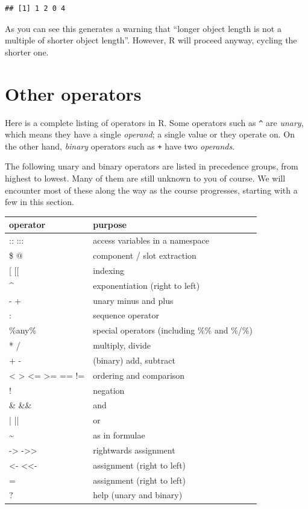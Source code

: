\documentclass[]{book}
\begin{document}
\begin{verbatim}
## [1] 1 2 0 4
\end{verbatim}

As you can see this generates a warning that ``longer object length is not a multiple of shorter object length''. However, R will proceed anyway, cycling the shorter one.

\hypertarget{other-operators}{%
\section{Other operators}\label{other-operators}}

Here is a complete listing of operators in R. Some operators such as \texttt{\^{}} are \emph{unary}, which means they have a single \emph{operand}; a single value or they operate on. On the other hand, \emph{binary} operators such as \texttt{+} have two \emph{operands}.

The following unary and binary operators are listed in precedence groups, from highest to lowest. Many of them are still unknown to you of course. We will encounter most of these along the way as the course progresses, starting with a few in this section.

\begin{tabular}{l|l}
\hline
operator & purpose\\
\hline
:: ::: & access variables in a namespace\\
\hline
\$ @ & component / slot extraction\\
\hline
[ [[ & indexing\\
\hline
\textasciicircum{} & exponentiation (right to left)\\
\hline
- + & unary minus and plus\\
\hline
: & sequence operator\\
\hline
\%any\% & special operators (including \%\% and \%/\%)\\
\hline
* / & multiply, divide\\
\hline
+ - & (binary) add, subtract\\
\hline
< > <= >= == != & ordering and comparison\\
\hline
! & negation\\
\hline
\& \&\& & and\\
\hline
| || & or\\
\hline
\textasciitilde{} & as in formulae\\
\hline
-> ->> & rightwards assignment\\
\hline
<- <<- & assignment (right to left)\\
\hline
= & assignment (right to left)\\
\hline
? & help (unary and binary)\\
\hline
\end{tabular}
\end{document}
